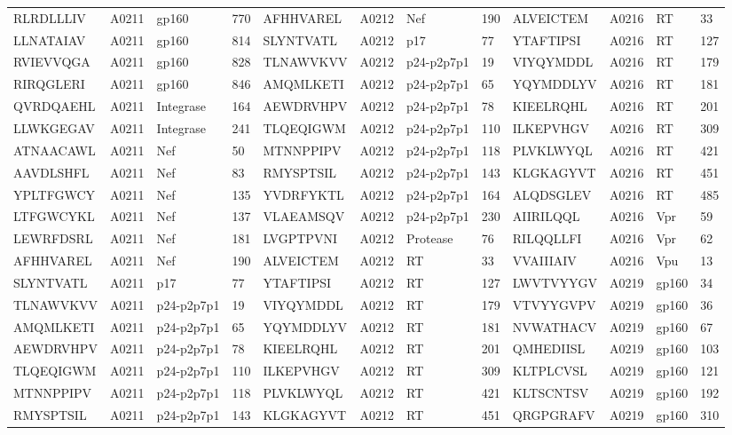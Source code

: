 \begin{table}[htp]
\begin{center}
\begin{sideways}
{\begin{tabulary}{1.5\textwidth}{|l|l|l|l|l|l|l|l|l|l|l|l|}
RLRDLLLIV & A0211 & gp160 & 770 & AFHHVAREL & A0212 & Nef & 190 & ALVEICTEM & A0216 & RT & 33 \\
LLNATAIAV & A0211 & gp160 & 814 & SLYNTVATL & A0212 & p17 & 77 & YTAFTIPSI & A0216 & RT & 127 \\
RVIEVVQGA & A0211 & gp160 & 828 & TLNAWVKVV & A0212 & p24-p2p7p1 & 19 & VIYQYMDDL & A0216 & RT & 179 \\
RIRQGLERI & A0211 & gp160 & 846 & AMQMLKETI & A0212 & p24-p2p7p1 & 65 & YQYMDDLYV & A0216 & RT & 181 \\
QVRDQAEHL & A0211 & Integrase & 164 & AEWDRVHPV & A0212 & p24-p2p7p1 & 78 & KIEELRQHL & A0216 & RT & 201 \\
LLWKGEGAV & A0211 & Integrase & 241 & TLQEQIGWM & A0212 & p24-p2p7p1 & 110 & ILKEPVHGV & A0216 & RT & 309 \\
ATNAACAWL & A0211 & Nef & 50 & MTNNPPIPV & A0212 & p24-p2p7p1 & 118 & PLVKLWYQL & A0216 & RT & 421 \\
AAVDLSHFL & A0211 & Nef & 83 & RMYSPTSIL & A0212 & p24-p2p7p1 & 143 & KLGKAGYVT & A0216 & RT & 451 \\
YPLTFGWCY & A0211 & Nef & 135 & YVDRFYKTL & A0212 & p24-p2p7p1 & 164 & ALQDSGLEV & A0216 & RT & 485 \\
LTFGWCYKL & A0211 & Nef & 137 & VLAEAMSQV & A0212 & p24-p2p7p1 & 230 & AIIRILQQL & A0216 & Vpr & 59 \\
LEWRFDSRL & A0211 & Nef & 181 & LVGPTPVNI & A0212 & Protease & 76 & RILQQLLFI & A0216 & Vpr & 62 \\
AFHHVAREL & A0211 & Nef & 190 & ALVEICTEM & A0212 & RT & 33 & VVAIIIAIV & A0216 & Vpu & 13 \\
SLYNTVATL & A0211 & p17 & 77 & YTAFTIPSI & A0212 & RT & 127 & LWVTVYYGV & A0219 & gp160 & 34 \\
TLNAWVKVV & A0211 & p24-p2p7p1 & 19 & VIYQYMDDL & A0212 & RT & 179 & VTVYYGVPV & A0219 & gp160 & 36 \\
AMQMLKETI & A0211 & p24-p2p7p1 & 65 & YQYMDDLYV & A0212 & RT & 181 & NVWATHACV & A0219 & gp160 & 67 \\
AEWDRVHPV & A0211 & p24-p2p7p1 & 78 & KIEELRQHL & A0212 & RT & 201 & QMHEDIISL & A0219 & gp160 & 103 \\
TLQEQIGWM & A0211 & p24-p2p7p1 & 110 & ILKEPVHGV & A0212 & RT & 309 & KLTPLCVSL & A0219 & gp160 & 121 \\
MTNNPPIPV & A0211 & p24-p2p7p1 & 118 & PLVKLWYQL & A0212 & RT & 421 & KLTSCNTSV & A0219 & gp160 & 192 \\
RMYSPTSIL & A0211 & p24-p2p7p1 & 143 & KLGKAGYVT & A0212 & RT & 451 & QRGPGRAFV & A0219 & gp160 & 310 \\

\end{tabulary}}
\end{sideways}
\end{center}
\end{table}
